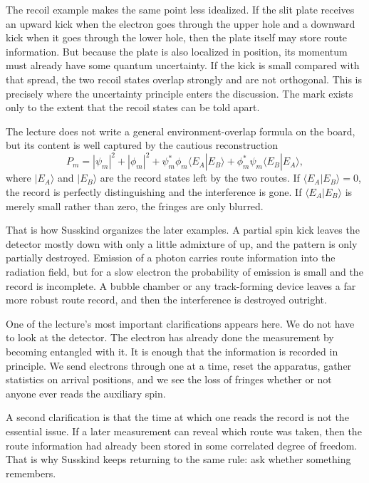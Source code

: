The recoil example makes the same point less idealized. If the slit plate receives an upward kick when the electron goes through the upper hole and a downward kick when it goes through the lower hole, then the plate itself may store route information. But because the plate is also localized in position, its momentum must already have some quantum uncertainty. If the kick is small compared with that spread, the two recoil states overlap strongly and are not orthogonal. This is precisely where the uncertainty principle enters the discussion. The mark exists only to the extent that the recoil states can be told apart.

The lecture does not write a general environment-overlap formula on the board, but its content is well captured by the cautious reconstruction
\begin{equation}
P_m
=
|\psi_m|^2+|\phi_m|^2
+\psi_m^*\phi_m\langle E_A|E_B\rangle
+\phi_m^*\psi_m\langle E_B|E_A\rangle ,
\end{equation}
where \(|E_A\rangle\) and \(|E_B\rangle\) are the record states left by the two routes. If \(\langle E_A|E_B\rangle=0\), the record is perfectly distinguishing and the interference is gone. If \(\langle E_A|E_B\rangle\) is merely small rather than zero, the fringes are only blurred.

That is how Susskind organizes the later examples. A partial spin kick leaves the detector mostly down with only a little admixture of up, and the pattern is only partially destroyed. Emission of a photon carries route information into the radiation field, but for a slow electron the probability of emission is small and the record is incomplete. A bubble chamber or any track-forming device leaves a far more robust route record, and then the interference is destroyed outright.

One of the lecture's most important clarifications appears here. We do not have to look at the detector. The electron has already done the measurement by becoming entangled with it. It is enough that the information is recorded in principle. We send electrons through one at a time, reset the apparatus, gather statistics on arrival positions, and we see the loss of fringes whether or not anyone ever reads the auxiliary spin.

A second clarification is that the time at which one reads the record is not the essential issue. If a later measurement can reveal which route was taken, then the route information had already been stored in some correlated degree of freedom. That is why Susskind keeps returning to the same rule: ask whether something remembers.

